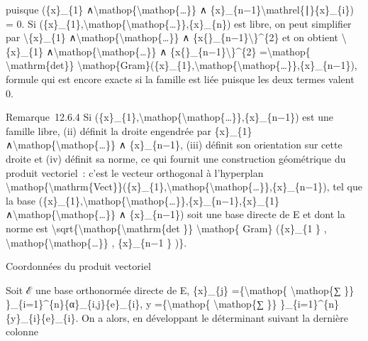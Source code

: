 \documentclass[]{article}
\begin{document}
puisque (\{x\}\_\{1\}
∧\textbackslash{}mathop\{\textbackslash{}mathop\{\ldots{}\}\} ∧
\{x\}\_\{n−1\}\textbackslash{}mathrel\{∣\}\{x\}\_\{i\}) = 0. Si
(\{x\}\_\{1\},\textbackslash{}mathop\{\textbackslash{}mathop\{\ldots{}\}\},\{x\}\_\{n\})
est libre, on peut simplifier par \textbackslash{}\textbar{}\{x\}\_\{1\}
∧\textbackslash{}mathop\{\textbackslash{}mathop\{\ldots{}\}\} ∧
\{x\{\}\_\{n−1\}\textbackslash{}\textbar{}\}\^{}\{2\} et on obtient
\textbackslash{}\textbar{}\{x\}\_\{1\}
∧\textbackslash{}mathop\{\textbackslash{}mathop\{\ldots{}\}\} ∧
\{x\{\}\_\{n−1\}\textbackslash{}\textbar{}\}\^{}\{2\}
=\textbackslash{}mathop\{ \textbackslash{}mathrm\{det\}\}
\textbackslash{}mathop\{Gram\}(\{x\}\_\{1\},\textbackslash{}mathop\{\textbackslash{}mathop\{\ldots{}\}\},\{x\}\_\{n−1\}),
formule qui est encore exacte si la famille est liée puisque les deux
termes valent 0.

Remarque~12.6.4 Si
(\{x\}\_\{1\},\textbackslash{}mathop\{\textbackslash{}mathop\{\ldots{}\}\},\{x\}\_\{n−1\})
est une famille libre, (ii) définit la droite engendrée par \{x\}\_\{1\}
∧\textbackslash{}mathop\{\textbackslash{}mathop\{\ldots{}\}\} ∧
\{x\}\_\{n−1\}, (iii) définit son orientation sur cette droite et (iv)
définit sa norme, ce qui fournit une construction géométrique du produit
vectoriel~: c'est le vecteur orthogonal à l'hyperplan
\textbackslash{}mathop\{\textbackslash{}mathrm\{Vect\}\}(\{x\}\_\{1\},\textbackslash{}mathop\{\textbackslash{}mathop\{\ldots{}\}\},\{x\}\_\{n−1\}),
tel que la base
(\{x\}\_\{1\},\textbackslash{}mathop\{\textbackslash{}mathop\{\ldots{}\}\},\{x\}\_\{n−1\},\{x\}\_\{1\}
∧\textbackslash{}mathop\{\textbackslash{}mathop\{\ldots{}\}\} ∧
\{x\}\_\{n−1\}) soit une base directe de E et dont la norme est
\textbackslash{}sqrt\{\textbackslash{}mathop\{\textbackslash{}mathrm\{det
\}\} \textbackslash{}mathop\{ Gram\} (\{x\}\_\{1 \} ,
\textbackslash{}mathop\{\textbackslash{}mathop\{\ldots{}\}\} ,
\{x\}\_\{n−1 \} )\}.

Coordonnées du produit vectoriel

Soit ℰ une base orthonormée directe de E, \{x\}\_\{j\}
=\{\textbackslash{}mathop\{ \textbackslash{}mathop\{∑ \}\}
\}\_\{i=1\}\^{}\{n\}\{α\}\_\{i,j\}\{e\}\_\{i\}, y
=\{\textbackslash{}mathop\{ \textbackslash{}mathop\{∑ \}\}
\}\_\{i=1\}\^{}\{n\}\{y\}\_\{i\}\{e\}\_\{i\}. On a alors, en développant
le déterminant suivant la dernière colonne
\end{document}
